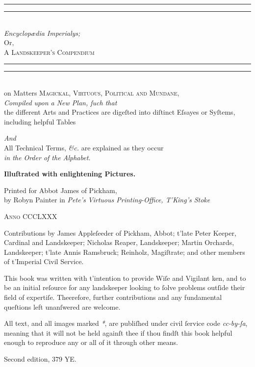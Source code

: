 \documentclass[twoside,11pt,b5paper,twocolumn]{scrbook}
\begin{document}
\begin{titlepage}
 \centering
 \vspace*{\baselineskip}
 \rule{\textwidth}{1.6pt}\vspace*{-\baselineskip}\vspace*{2pt}
 \rule{\textwidth}{0.4pt}\\[\baselineskip]
 
 {\Huge \itshape Encyclopædia Imperialys;}\\[0.4em]
 {\Large Or,\\[0.4em]}
 {\huge\scshape A Landskeeper's Compendium}\\
 \rule{\textwidth}{0.4pt}\vspace*{-\baselineskip}\vspace{3.2pt}
 \rule{\textwidth}{1.6pt}\\[\baselineskip]
 {\Large on Matters \scshape Magickal, Virtuous, Political {\normalfont and} Mundane,\\[1em]}
 {\itshape Compiled upon a New Plan, ſuch that\\[0.5em]}
 {\large the different Arts and Practices are digeſted into diſtinct Eſsayes or Syſtems, including helpful Tables}
 
 {\itshape And\\[0.5em]}
 {\large All Technical Terms, \textit{\&c.} are explained as they occur \\[0.5em] \itshape in the Order of the Alphabet.}

 \vspace{0.8cm}
 {\bfseries Illuſtrated with enlightening Pictures.}
 
 \vfill
 
 Printed for Abbot James of Pickham,\\[0.4em]
 by Robyn Painter in {\itshape Pete’s Virtuous Printing-Office, T'King's Stoke}
 
 {\scshape Anno CCCLXXX}
\end{titlepage}
\begin{uppertitleback}{}
Contributions by James Appleſeeder of Pickham, Abbot; t'late Peter Keeper, Cardinal and Landskeeper; Nicholas Reaper, Landskeeper; Martin Orchards, Landskeeper; t'late Annis Ramsbruck; Reinholz, Magiſtrate; and other members of t'Imperial Civil Service.

This book was written with t'intention to provide Wiſe and Vigilant ken, and to be an initial reſource for any landskeeper looking to ſolve problems outſide their field of expertiſe. Theerefore, further contributions and any fundamental queſtions left unanſwered are welcome.

All text, and all images marked \textit{*}, are publiſhed under civil ſervice code \textit{cc-by-ſa}, meaning that it will not be held againſt thee if thou findſt this book helpful enough to reproduce any or all of it through other means.

Second edition, 379 YE.
\end{uppertitleback}
\setlength{\parindent}{1em}
\end{document}
